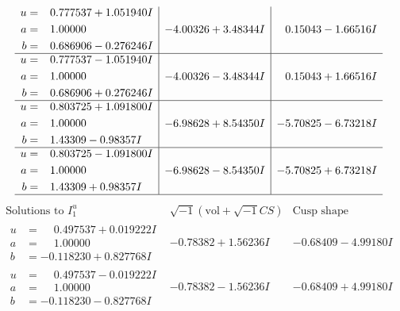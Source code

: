 \documentclass[1p]{elsarticle_modified}
\theoremstyle{definition}
\newcommand{\I}{\sqrt{-1}}
\begin{document}
$$\begin{array}{c|c|c}
\begin{aligned}
u &= \phantom{-}0.777537 + 1.051940 I \\
a &= \phantom{-}1.00000\phantom{ +0.000000I} \\
b &= \phantom{-}0.686906 - 0.276246 I\end{aligned}
 & -4.00326 + 3.48344 I & \phantom{-}0.15043 - 1.66516 I \\ \hline\begin{aligned}
u &= \phantom{-}0.777537 - 1.051940 I \\
a &= \phantom{-}1.00000\phantom{ +0.000000I} \\
b &= \phantom{-}0.686906 + 0.276246 I\end{aligned}
 & -4.00326 - 3.48344 I & \phantom{-}0.15043 + 1.66516 I \\ \hline\begin{aligned}
u &= \phantom{-}0.803725 + 1.091800 I \\
a &= \phantom{-}1.00000\phantom{ +0.000000I} \\
b &= \phantom{-}1.43309 - 0.98357 I\end{aligned}
 & -6.98628 + 8.54350 I & -5.70825 - 6.73218 I \\ \hline\begin{aligned}
u &= \phantom{-}0.803725 - 1.091800 I \\
a &= \phantom{-}1.00000\phantom{ +0.000000I} \\
b &= \phantom{-}1.43309 + 0.98357 I\end{aligned}
 & -6.98628 - 8.54350 I & -5.70825 + 6.73218 I\\
 \hline 
 \end{array}$$\newpage$$\begin{array}{c|c|c}  
\text{Solutions to }I^u_{1}& \I (\text{vol} + \sqrt{-1}CS) & \text{Cusp shape}\\
 \hline 
\begin{aligned}
u &= \phantom{-}0.497537 + 0.019222 I \\
a &= \phantom{-}1.00000\phantom{ +0.000000I} \\
b &= -0.118230 + 0.827768 I\end{aligned}
 & -0.78382 + 1.56236 I & -0.68409 - 4.99180 I \\ \hline\begin{aligned}
u &= \phantom{-}0.497537 - 0.019222 I \\
a &= \phantom{-}1.00000\phantom{ +0.000000I} \\
b &= -0.118230 - 0.827768 I\end{aligned}
 & -0.78382 - 1.56236 I & -0.68409 + 4.99180 I \\ \hline\begin{aligned}

\end{aligned}
\end{array}$$
\end{document}

